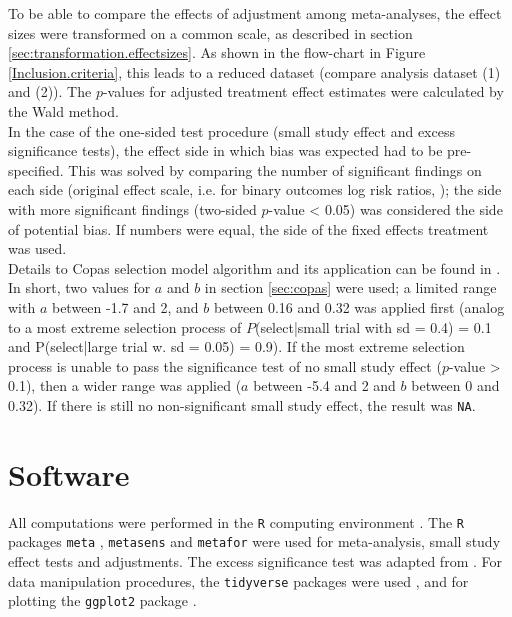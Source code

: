 \documentclass[11pt,a4paper,twoside]{book}\usepackage[]{graphicx}\usepackage[]{color}
\begin{document}
To be able to compare the effects of adjustment among meta-analyses, the effect sizes were transformed on a common scale, as described in section \ref{sec:transformation.effectsizes}. As shown in the flow-chart in Figure \ref{Inclusion.criteria}, this leads to a reduced dataset (compare analysis dataset (1) and (2)). The $p$-values for adjusted treatment effect estimates were calculated by the Wald method. \\
In the case of the one-sided test procedure (small study effect and excess significance tests), the effect side in which bias was expected had to be pre-specified. This was solved by comparing the number of significant findings on each side (original effect scale, i.e. for binary outcomes log risk ratios, \etc); the side with more significant findings (two-sided $p$-value < 0.05) was considered the side of potential bias. If numbers were equal, the side of the fixed effects treatment was used. \\
Details to Copas selection model algorithm and its application can be found in \citet{limitmeta}. In short, two values for $a$ and $b$ in section \ref{sec:copas} were used; a limited range with $a$ between -1.7 and 2, and $b$ between 0.16 and 0.32 was applied first (analog to a most extreme selection process of $P$(select|small trial with sd = 0.4) = 0.1 and P(select|large trial w. sd  = 0.05) = 0.9). If the most extreme selection process is unable to pass the significance test of no small study effect ($p$-value > 0.1), then a wider range was applied ($a$  between -5.4 and 2 and $b$ between 0 and 0.32). If there is still no non-significant small study effect, the result was \texttt{NA}.


\section{Software}
All computations were performed in the \texttt{R} computing environment \citep{R.base}. The \texttt{R} packages \texttt{meta} \citep{meta.package}, \texttt{metasens} \citep{metasens.package} and \texttt{metafor} \citep{metafor.package} were used for meta-analysis, small study effect tests and adjustments. The excess significance test was adapted from \citet{vanAert.2019}. For data manipulation procedures, the \texttt{tidyverse} packages were used \citep{tidyverse.package}, and for plotting the \texttt{ggplot2} package \citep{ggplot2}.\\


\end{document}
